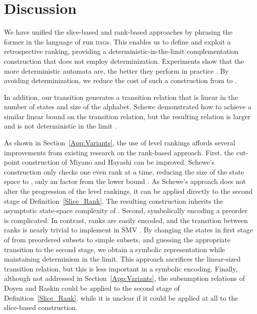 \documentclass{LMCS}
\newcommand{\DAGs}{\textsc{dag}s\xspace}
\begin{document}
\cbend

\section{Discussion}

We have unified the slice-based and rank-based approaches by phrasing the former in the language of
run \DAGs. This enables us to define and exploit a retrospective ranking, providing a
deterministic-in-the-limit complementation construction that does not employ determinization.
Experiments show that the more deterministic automata are, the better they perform in practice
\cite{ST03}. By avoiding determinization, we reduce the cost of such a construction from 
to  \cite{Pit06}.

In addition, our transition generates a transition relation that is linear in the number of states
and size of the alphabet. Schewe demonstrated how to achieve a similar linear bound on the
transition relation, but the resulting relation is larger and is not deterministic in the limit
\cite{Sch09}.

As shown in Section~\ref{App:Variants}, the use of level rankings affords several improvements from
existing research on the rank-based approach. First, the cut-point construction of Miyano and
Hayashi \cite{MH84} can be improved. Schewe's construction only checks one even rank at a time,
reducing the size of the state space to , only an  factor from the lower bound
\cite{Sch09}. As Schewe's approach does not alter the progression of the level rankings, it can be
applied directly to the second stage of Definition~\ref{Slice_Rank}.  The resulting construction
inherits the asymptotic state-space complexity of \cite{Sch09}. Second, symbolically encoding a
preorder is complicated.  In contrast, ranks are easily encoded, and the transition between ranks is
nearly trivial to implement in SMV \cite{TV07}.  By changing the states in first stage of 
from preordered subsets to simple subsets, and guessing the appropriate transition to the second
stage, we obtain a symbolic representation while maintaining determinism in the limit.  This
approach sacrifices the linear-sized transition relation, but this is less important in a symbolic
encoding.  Finally, although not addressed in Section~\ref{App:Variants}, the subsumption relations
of Doyen and Raskin \cite{DR09} could be applied to the second stage of 
Definition~\ref{Slice_Rank}, while it is unclear if it could be applied at all to the slice-based
construction. 
\end{document}
